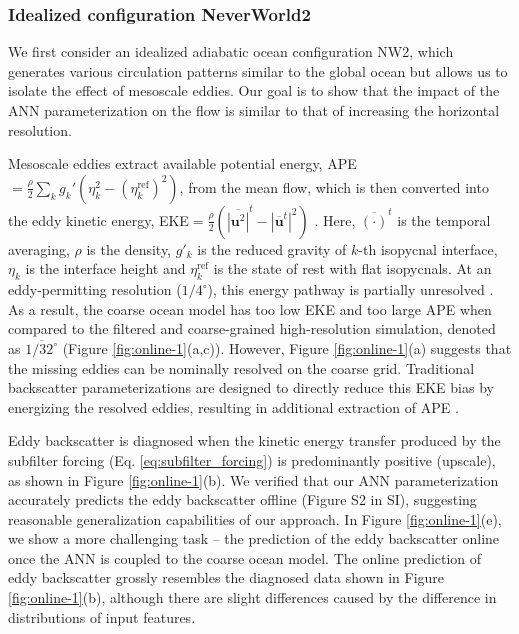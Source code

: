 \documentclass[draft]{agujournal2019}
\begin{document}
\subsubsection{Idealized configuration NeverWorld2} \label{sec:nw2}

We first consider an idealized adiabatic ocean configuration NW2, which generates various circulation patterns similar to the global ocean but allows us to isolate the effect of mesoscale eddies. Our goal is to show that the impact of the ANN parameterization on the flow is similar to that of increasing the horizontal resolution. 

%
Mesoscale eddies extract available potential energy, APE$=\frac{\rho}{2} \sum_k g_k' ( \eta_k^2 - (\eta^{\mathrm{ref}}_k)^2 )$, from the mean flow, which is then converted into the eddy kinetic energy, EKE$=\frac{\rho}{2}(\overline{|\mathbf{u}^2|}^t-|\overline{\mathbf{u}}^t|^2)$ \cite{salmon1980baroclinic}. Here, $\overline{(\cdot)}^t$ is the temporal averaging, $\rho$ is the density, $g'_k$ is the reduced gravity of $k$-th isopycnal interface, $\eta_k$ is the interface height and $\eta^{\mathrm{ref}}_k$ is the state of rest with flat isopycnals. At an eddy-permitting resolution ($1/4^\circ$), this energy pathway is partially unresolved \cite{jansen2014parameterizing, mana2014toward, juricke2019ocean, loose2023diagnosing}. As a result, the coarse ocean model has too low EKE and too large APE when compared to the filtered and coarse-grained high-resolution simulation, denoted as $\overline{1/32^\circ}$ (Figure \ref{fig:online-1}(a,c)). However, Figure \ref{fig:online-1}(a) suggests that the missing eddies can be nominally resolved on the coarse grid. Traditional backscatter parameterizations are designed to directly reduce this EKE bias by energizing the resolved eddies, resulting in additional extraction of APE \cite{jansen2014parameterizing, yankovsky2024}.

Eddy backscatter is diagnosed when the kinetic energy transfer produced by the subfilter forcing (Eq. \eqref{eq:subfilter_forcing}) is predominantly positive (upscale), as shown in Figure \ref{fig:online-1}(b).
We verified that our ANN parameterization accurately predicts the eddy backscatter offline (Figure S2 in SI), suggesting reasonable generalization capabilities of our approach. In Figure \ref{fig:online-1}(e), we show a more challenging task -- the prediction of the eddy backscatter online once the ANN is coupled to the coarse ocean model. The online prediction of eddy backscatter grossly resembles the diagnosed data shown in Figure \ref{fig:online-1}(b), although there are slight differences caused by the difference in distributions of input features.
\end{document}
